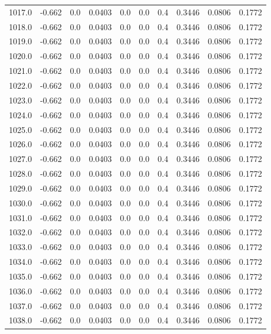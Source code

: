 \begin{longtable}{lrrrrrrrrr}
1017.0 & -0.662 & 0.0 & 0.0403 & 0.0 & 0.0 & 0.4 & 0.3446 & 0.0806 & 0.1772 \\
1018.0 & -0.662 & 0.0 & 0.0403 & 0.0 & 0.0 & 0.4 & 0.3446 & 0.0806 & 0.1772 \\
1019.0 & -0.662 & 0.0 & 0.0403 & 0.0 & 0.0 & 0.4 & 0.3446 & 0.0806 & 0.1772 \\
1020.0 & -0.662 & 0.0 & 0.0403 & 0.0 & 0.0 & 0.4 & 0.3446 & 0.0806 & 0.1772 \\
1021.0 & -0.662 & 0.0 & 0.0403 & 0.0 & 0.0 & 0.4 & 0.3446 & 0.0806 & 0.1772 \\
1022.0 & -0.662 & 0.0 & 0.0403 & 0.0 & 0.0 & 0.4 & 0.3446 & 0.0806 & 0.1772 \\
1023.0 & -0.662 & 0.0 & 0.0403 & 0.0 & 0.0 & 0.4 & 0.3446 & 0.0806 & 0.1772 \\
1024.0 & -0.662 & 0.0 & 0.0403 & 0.0 & 0.0 & 0.4 & 0.3446 & 0.0806 & 0.1772 \\
1025.0 & -0.662 & 0.0 & 0.0403 & 0.0 & 0.0 & 0.4 & 0.3446 & 0.0806 & 0.1772 \\
1026.0 & -0.662 & 0.0 & 0.0403 & 0.0 & 0.0 & 0.4 & 0.3446 & 0.0806 & 0.1772 \\
1027.0 & -0.662 & 0.0 & 0.0403 & 0.0 & 0.0 & 0.4 & 0.3446 & 0.0806 & 0.1772 \\
1028.0 & -0.662 & 0.0 & 0.0403 & 0.0 & 0.0 & 0.4 & 0.3446 & 0.0806 & 0.1772 \\
1029.0 & -0.662 & 0.0 & 0.0403 & 0.0 & 0.0 & 0.4 & 0.3446 & 0.0806 & 0.1772 \\
1030.0 & -0.662 & 0.0 & 0.0403 & 0.0 & 0.0 & 0.4 & 0.3446 & 0.0806 & 0.1772 \\
1031.0 & -0.662 & 0.0 & 0.0403 & 0.0 & 0.0 & 0.4 & 0.3446 & 0.0806 & 0.1772 \\
1032.0 & -0.662 & 0.0 & 0.0403 & 0.0 & 0.0 & 0.4 & 0.3446 & 0.0806 & 0.1772 \\
1033.0 & -0.662 & 0.0 & 0.0403 & 0.0 & 0.0 & 0.4 & 0.3446 & 0.0806 & 0.1772 \\
1034.0 & -0.662 & 0.0 & 0.0403 & 0.0 & 0.0 & 0.4 & 0.3446 & 0.0806 & 0.1772 \\
1035.0 & -0.662 & 0.0 & 0.0403 & 0.0 & 0.0 & 0.4 & 0.3446 & 0.0806 & 0.1772 \\
1036.0 & -0.662 & 0.0 & 0.0403 & 0.0 & 0.0 & 0.4 & 0.3446 & 0.0806 & 0.1772 \\
1037.0 & -0.662 & 0.0 & 0.0403 & 0.0 & 0.0 & 0.4 & 0.3446 & 0.0806 & 0.1772 \\
1038.0 & -0.662 & 0.0 & 0.0403 & 0.0 & 0.0 & 0.4 & 0.3446 & 0.0806 & 0.1772 \\

\end{longtable}
